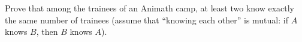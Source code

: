 Prove that among the trainees of an Animath camp, at least two know exactly the same number of trainees (assume that “knowing each other” is mutual: if $A$ knows $B$, then $B$ knows $A$).
